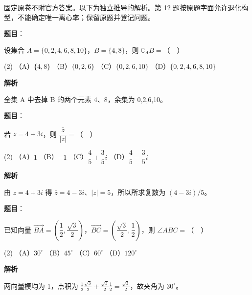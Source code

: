 

\begin{gktip}
固定原卷不附官方答案。以下为独立推导的解析。第 12 题按原题字面允许退化构型，不能确定唯一离心率；保留原题并登记问题。
\end{gktip}

\begin{answer}

\textbf{题目}：

设集合 \(A=\{0,2,4,6,8,10\}\)，\(B=\{4,8\}\)，则 \(\complement_A B=\)（　）

\begin{gkopts}(2)
\task （A）\(\{4,8\}\)
\task （B）\(\{0,2,6\}\)
\task （C）\(\{0,2,6,10\}\)
\task （D）\(\{0,2,4,6,8,10\}\)
\end{gkopts}

\textbf{解析}

全集 A 中去掉 B 的两个元素 4、8，余集为 {0,2,6,10}。


\end{answer}
\begin{answer}

\textbf{题目}：

若 \(z=4+3i\)，则 \(\dfrac{\bar z}{|z|}=\)（　）

\begin{gkopts}(2)
\task （A）\(1\)
\task （B）\(-1\)
\task （C）\(\dfrac45+\dfrac35i\)
\task （D）\(\dfrac45-\dfrac35i\)
\end{gkopts}

\textbf{解析}

由 \(z=4+3i\) 得 \(\bar z=4-3i\)、\(|z|=5\)，所以所求复数为 \((4-3i)/5\)。


\end{answer}
\begin{answer}

\textbf{题目}：

已知向量 \(\overrightarrow{BA}=\left(\dfrac12,\dfrac{\sqrt3}{2}\right)\)，\(\overrightarrow{BC}=\left(\dfrac{\sqrt3}{2},\dfrac12\right)\)，则 \(\angle ABC=\)（　）

\begin{gkopts}(2)
\task （A）\(30^\circ\)
\task （B）\(45^\circ\)
\task （C）\(60^\circ\)
\task （D）\(120^\circ\)
\end{gkopts}

\textbf{解析}

两向量模均为 1，点积为 \(\frac12\frac{\sqrt3}{2}+\frac{\sqrt3}{2}\frac12=\frac{\sqrt3}{2}\)，故夹角为 \(30^\circ\)。


\end{answer}
